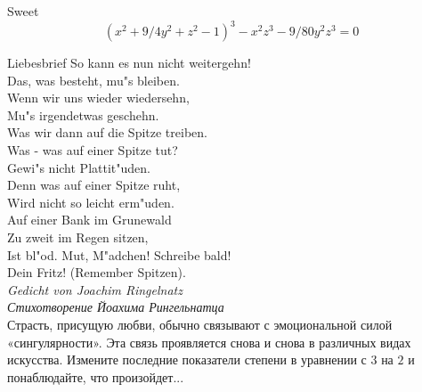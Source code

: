 \begin{surferPage}{Sweet}
\smallskip
\[(x^2+ 9/4y^2	+ z^2- 1)^3- x^2z^3	- 9/80y^2z^3	= 0\]

\singlespacing
Liebesbrief
\singlespacing
So kann es nun nicht weitergehn! \\
Das, was besteht, mu"s bleiben. \\
Wenn wir uns wieder wiedersehn, \\
Mu"s irgendetwas geschehn. \\
Was wir dann auf die Spitze treiben.\\ 
Was - was auf einer Spitze tut? \\
Gewi"s nicht Plattit"uden. \\
Denn was auf einer Spitze ruht, \\
Wird nicht so leicht erm"uden. \\
Auf einer Bank im Grunewald \\
Zu zweit im Regen sitzen, \\
Ist bl"od. Mut, M"adchen! Schreibe bald! \\
Dein Fritz! (Remember Spitzen). \\
 {\it Gedicht von Joachim Ringelnatz}\\
 {\it Стихотворение Йоахима Рингельнатца}\\
\singlespacing 
Страсть, присущую любви, обычно связывают с эмоциональной силой «сингулярности». Эта связь проявляется снова и снова в различных видах искусства.
\singlespacing 
Измените последние показатели степени в уравнении с $3$ на $2$ и понаблюдайте, что произойдет...
\end{surferPage}
